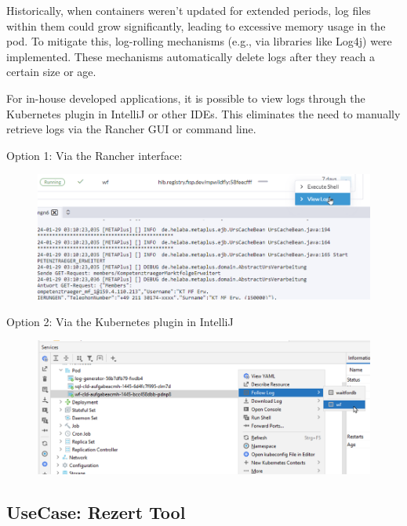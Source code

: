 \documentclass[../main.tex]{subfiles}
\begin{document}
Historically, when containers weren’t updated for extended periods, log files within them could grow significantly, leading to excessive memory usage in the pod. To mitigate this, log-rolling mechanisms (e.g., via libraries like Log4j) were implemented. These mechanisms automatically delete logs after they reach a certain size or age.

For in-house developed applications, it is possible to view logs through the Kubernetes plugin in IntelliJ or other IDEs. This eliminates the need to manually retrieve logs via the Rancher GUI or command line. 

Option 1: Via the Rancher interface:

\begin{figure}[H]
        \centering
        \includegraphics[scale=0.8]{img/3-background/gitlab/rancher_logs_gui.png}
        \caption{}
        \label{fig:rancher_logs_gui}
    \end{figure}

Option 2: Via the Kubernetes plugin in IntelliJ

\begin{figure}[H]
        \centering
        \includegraphics[scale=0.8]{img/3-background/gitlab/logs_plugin.png}
        \caption{}
        \label{fig:logs_plugin}
    \end{figure}

\subsection{UseCase: Rezert Tool}
\end{document}
